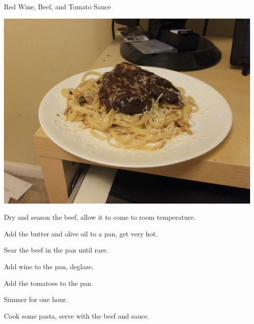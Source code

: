 \documentclass{recipe}
\begin{document}
\begin{recipe}{Red Wine, Beef, and Tomato Sauce}

  \begin{ingredients}
  \end{ingredients}

  \begin{images}
    \begin{image}
      \includegraphics[width=0.9\linewidth,trim=400px 400px 200px 500px, clip=true]{beef_wine_pasta-01.jpeg}
    \end{image}
  \end{images}

  \begin{steps}
  \item Dry and season the beef, allow it to come to room temperature.
  \item Add the butter and olive oil to a pan, get very hot.
  \item Sear the beef in the pan until rare.
  \item Add wine to the pan, deglaze.
  \item Add the tomatoes to the pan.
  \item Simmer for one hour.
  \item Cook some pasta, serve with the beef and sauce.
  \end{steps}


\end{recipe}
\end{document}
